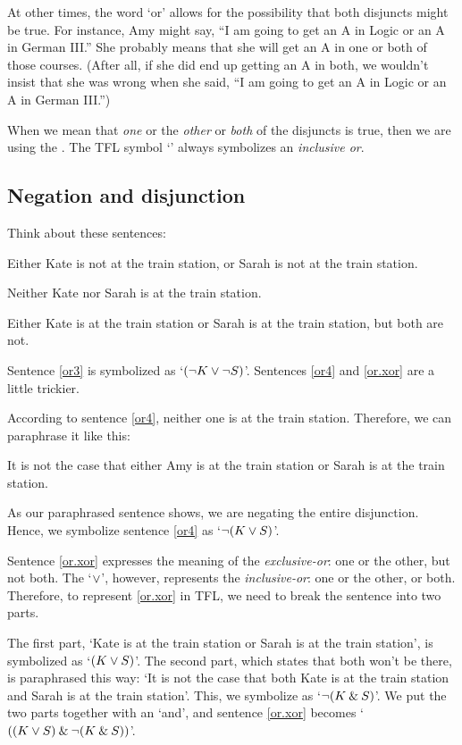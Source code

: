 At other times, the word `or' allows for the possibility that both disjuncts might be true. For instance, Amy might say, ``I am going to get an A in Logic or an A in German III.'' She probably means that she will get an A in one or both of those courses. (After all, if she did end up getting an A in both, we wouldn't insist that she was wrong when she said, ``I am going to get an A in Logic or an A in German III.'')

When we mean that \textit{one} or the \textit{other} or \textit{both} of the disjuncts is true, then we are using the . The TFL symbol `\eor' always symbolizes an \emph{inclusive or}.

\subsection{Negation and disjunction}

Think about these sentences:
	\begin{earg}
		\item[\ex{or3}] Either Kate is not at the train station, or Sarah is not at the train station.
		\item[\ex{or4}] Neither Kate nor Sarah is at the train station.
		\item[\ex{or.xor}] Either Kate is at the train station or Sarah is at the train station, but both are not.
	\end{earg}
Sentence \ref{or3} is symbolized as `$({\neg} K \vee {\neg} S)$'. Sentences \ref{or4} and \ref{or.xor} are a little trickier. 

According to sentence \ref{or4}, neither one is at the train station. Therefore, we can paraphrase it like this:
\begin{ebullet}
	\item[] It is not the case that either Amy is at the train station or Sarah is at the train station. 
\end{ebullet}
As our paraphrased sentence shows, we are negating the entire disjunction. Hence, we symbolize sentence \ref{or4} as `${\neg} (K \vee S)$'. 

Sentence \ref{or.xor} expresses the meaning of the \textit{exclusive-or}: one or the other, but not both. The `$\vee$', however, represents the \textit{inclusive-or}: one or the other, or both. Therefore, to represent \ref{or.xor} in TFL, we need to break the sentence into two parts. 

The first part, `Kate is at the train station or Sarah is at the train station', is symbolized as `$(K \vee S)$'. The second part, which states that both won't be there, is paraphrased this way: `It is not the case that both Kate is at the train station and Sarah is at the train station'. This, we symbolize as `${\neg}(K \mathbin{\&} S)$'. We put the two parts together with an `and', and sentence \ref{or.xor} becomes `$((K \vee S) \mathbin{\&}  {\neg}(K \mathbin{\&} S))$'.

